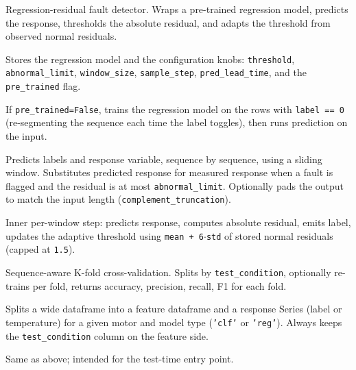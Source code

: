 \documentclass[11pt,a4paper]{article}
\begin{document}
\begin{description}[leftmargin=0pt,labelindent=0pt,style=nextline,
                    font=\normalfont\ttfamily]

\item[FaultDetectReg (class)]
  Regression-residual fault detector. Wraps a pre-trained regression model,
  predicts the response, thresholds the absolute residual, and adapts the
  threshold from observed normal residuals.

\item[\quad \_\_init\_\_]
  Stores the regression model and the configuration knobs:
  \texttt{threshold}, \texttt{abnormal\_limit}, \texttt{window\_size},
  \texttt{sample\_step}, \texttt{pred\_lead\_time}, and the
  \texttt{pre\_trained} flag.

\item[\quad fit]
  If \texttt{pre\_trained=False}, trains the regression model on the rows
  with \texttt{label == 0} (re-segmenting the sequence each time the label
  toggles), then runs prediction on the input.

\item[\quad predict]
  Predicts labels and response variable, sequence by sequence, using a
  sliding window. Substitutes predicted response for measured response when
  a fault is flagged and the residual is at most \texttt{abnormal\_limit}.
  Optionally pads the output to match the input length
  (\texttt{complement\_truncation}).

\item[\quad predict\_label\_by\_reg\_base]
  Inner per-window step: predicts response, computes absolute residual,
  emits label, updates the adaptive threshold using
  \texttt{mean + 6$\cdot$std} of stored normal residuals (capped at
  \texttt{1.5}).

\item[\quad run\_cross\_val]
  Sequence-aware K-fold cross-validation. Splits by
  \texttt{test\_condition}, optionally re-trains per fold, returns accuracy,
  precision, recall, F1 for each fold.

\item[extract\_selected\_feature]
  Splits a wide dataframe into a feature dataframe and a response Series
  (label or temperature) for a given motor and model type
  (\texttt{'clf'} or \texttt{'reg'}). Always keeps the
  \texttt{test\_condition} column on the feature side.

\item[extract\_selected\_feature\_testing]
  Same as above; intended for the test-time entry point.


\end{description}
\end{document}
